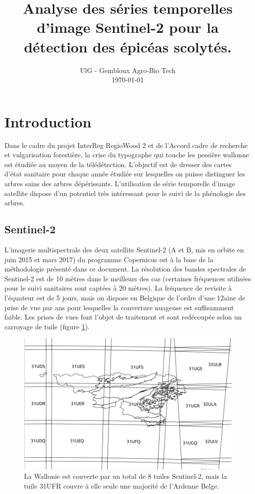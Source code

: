 \documentclass[a4paper, 12pt]{article} %
\title{Analyse des séries temporelles d'image Sentinel-2 pour la détection des épicéas scolytés.}
\date{%
    UlG - Gembloux Agro-Bio Tech
    \\
    \today
}
\begin{document}
\maketitle

\tableofcontents

\section{Introduction}

Dans le cadre du projet InterReg RegioWood 2 et de l'Accord cadre de recherche et vulgarisation forestière, la crise du typographe qui touche les pessière wallonne est étudiée au moyen de la télédétection. L'objectif est de dresser des cartes d'état sanitaire pour chaque année étudiée sur lesquelles on puisse distinguer les arbres sains des arbres dépérissants. L'utilisation de série temporelle d'image satellite dispose d'un potentiel très intéressant pour le suivi de la phénologie des arbres.

\subsection{Sentinel-2}

L'imagerie multispectrale des deux satellite Sentinel-2 (A et B, mis en orbite en juin 2015 et mars 2017) du programme Copernicus est à la base de la méthodologie présenté dans ce document. La résolution des bandes spectrales de Sentinel-2 est de 10 mètres dans le meilleurs des cas (certaines fréquences utilisées pour le suivi sanitaires sont captées à 20 mètres). La fréquence de revisite à l'équateur est de 5 jours, mais on dispose en Belgique de l'ordre d'une 12aine de prise de vue par ans pour lesquelles la couverture nuageuse est suffisamment faible. Les prises de vues font l'objet de traitement et sont redécoupée selon un carroyage de tuile (figure \ref{fig:tuileRW}).

\begin{figure}[H]
\centering
\includegraphics[width=0.9\linewidth]{../theia_d/tuileS2Nom.png}
\caption{La Wallonie est couverte par un total de 8 tuiles Sentinel-2, mais la tuile 31UFR couvre à elle seule une majorité de l'Ardenne Belge.}
\label{fig:tuileRW}
\end{figure}
\end{document}
